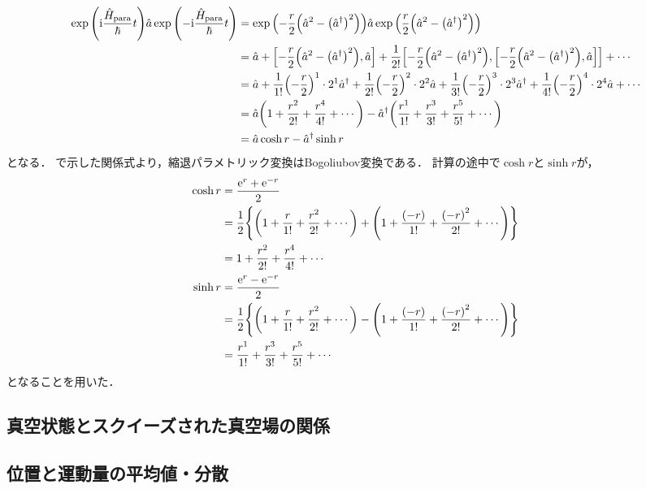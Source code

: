 \documentclass{report}
\begin{document}
    \begin{align}
      \exp\qty(\mathrm{i}\frac{\hat{H}_{\mathrm{para}}}{\hbar}t)\hat{a}\exp\qty(-\mathrm{i}\frac{\hat{H}_{\mathrm{para}}}{\hbar}t) &= \exp\qty(-\frac{r}{2}\qty(\hat{a}^2 - \qty(\hat{a}^{\dag})^2))\hat{a}\exp\qty(\frac{r}{2}\qty(\hat{a}^2 - \qty(\hat{a}^{\dag})^2)) \\ 
      &= \hat{a} + \qty[-\frac{r}{2}\qty(\hat{a}^2 - \qty(\hat{a}^{\dag})^2), \hat{a}] + \frac{1}{2!}\qty[-\frac{r}{2}\qty(\hat{a}^2 - \qty(\hat{a}^{\dag})^2), \qty[-\frac{r}{2}\qty(\hat{a}^2 - \qty(\hat{a}^{\dag})^2), \hat{a}]] + \cdots \\ 
      &= \hat{a} + \frac{1}{1!}\qty(-\frac{r}{2})^1\cdot 2^1\hat{a}^{\dag} + \frac{1}{2!}\qty(-\frac{r}{2})^2\cdot 2^2\hat{a} + \frac{1}{3!}\qty(-\frac{r}{2})^3\cdot 2^3\hat{a}^{\dag} + \frac{1}{4!}\qty(-\frac{r}{2})^4\cdot 2^4\hat{a} + \cdots \\ 
      &= \hat{a}\qty(1 + \frac{r^2}{2!} + \frac{r^4}{4!} + \cdots) - \hat{a}^{\dag}\qty(\frac{r^1}{1!} + \frac{r^3}{3!} + \frac{r^5}{5!} + \cdots) \\ 
      &= \hat{a}\cosh r - \hat{a}^{\dag}\sinh r
    \end{align}
    となる．
    で示した関係式より，縮退パラメトリック変換はBogoliubov変換である．
    計算の途中で$\cosh r$と$\sinh r$が，
    \begin{align}
      \cosh r &= \frac{\mathrm{e}^r + \mathrm{e}^{-r}}{2} \\ 
      &= \frac{1}{2}\qty{\qty(1 + \frac{r}{1!} + \frac{r^2}{2!} + \cdots) + \qty(1 + \frac{\qty(-r)}{1!} + \frac{\qty(-r)^2}{2!} + \cdots)} \\ 
      &= 1 + \frac{r^2}{2!} + \frac{r^4}{4!} + \cdots \\ 
      \sinh r &= \frac{\mathrm{e}^r - \mathrm{e}^{-r}}{2} \\ 
      &= \frac{1}{2}\qty{\qty(1 + \frac{r}{1!} + \frac{r^2}{2!} + \cdots) - \qty(1 + \frac{\qty(-r)}{1!} + \frac{\qty(-r)^2}{2!} + \cdots)} \\ 
      &= \frac{r^1}{1!} + \frac{r^3}{3!} + \frac{r^5}{5!} + \cdots \\
    \end{align}
    となることを用いた．
  \subsection{真空状態とスクイーズされた真空場の関係}
  \subsection{位置と運動量の平均値・分散}
\end{document}
